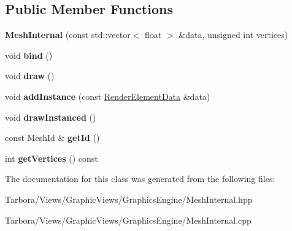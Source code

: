 \subsection*{Public Member Functions}
\begin{DoxyCompactItemize}
\item 
\mbox{\label{classTarbora_1_1MeshInternal_ac8e4729cafca29f2c4a9b5fe66450521}} 
{\bfseries Mesh\+Internal} (const std\+::vector$<$ float $>$ \&data, unsigned int vertices)
\item 
\mbox{\label{classTarbora_1_1MeshInternal_a908f6cf466f05abf42b48b0188fd8e69}} 
void {\bfseries bind} ()
\item 
\mbox{\label{classTarbora_1_1MeshInternal_a1fb14a869b44cb50a9e018c248b117ec}} 
void {\bfseries draw} ()
\item 
\mbox{\label{classTarbora_1_1MeshInternal_a0e35f9d473c5057aca6abf446dea0844}} 
void {\bfseries add\+Instance} (const \hyperlink{structTarbora_1_1RenderElementData}{Render\+Element\+Data} \&data)
\item 
\mbox{\label{classTarbora_1_1MeshInternal_aa75884c036e18012c159cc1b494fa2f1}} 
void {\bfseries draw\+Instanced} ()
\item 
\mbox{\label{classTarbora_1_1MeshInternal_a096d8136fe0beafc264e8d569f4b4d9b}} 
const Mesh\+Id \& {\bfseries get\+Id} ()
\item 
\mbox{\label{classTarbora_1_1MeshInternal_a40730404ec626f4471d098a3def8280b}} 
int {\bfseries get\+Vertices} () const
\end{DoxyCompactItemize}


The documentation for this class was generated from the following files\+:\begin{DoxyCompactItemize}
\item 
Tarbora/\+Views/\+Graphic\+Views/\+Graphics\+Engine/Mesh\+Internal.\+hpp\item 
Tarbora/\+Views/\+Graphic\+Views/\+Graphics\+Engine/Mesh\+Internal.\+cpp\end{DoxyCompactItemize}
